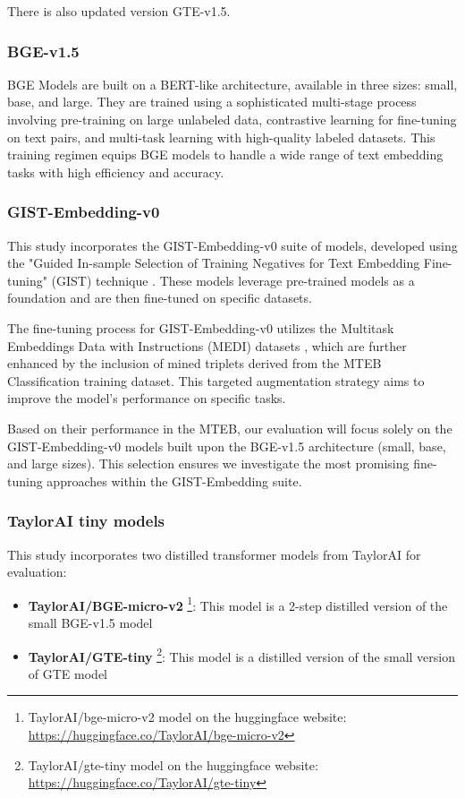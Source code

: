 There is also updated version \ac{GTE}-v1.5.

\subsubsection{BGE-v1.5} \label{model:bge}
\ac{BGE} Models \cite{xiao2024cpack} are built on a BERT-like architecture, available in three sizes: small, base, and large.
They are trained using a sophisticated multi-stage process involving pre-training on large unlabeled data, contrastive learning for fine-tuning on text pairs, and multi-task learning with high-quality labeled datasets.
This training regimen equips BGE models to handle a wide range of text embedding tasks with high efficiency and accuracy.

\subsubsection{GIST-Embedding-v0}
This study incorporates the GIST-Embedding-v0 suite of models, developed using the "Guided In-sample Selection of Training Negatives for Text Embedding Fine-tuning" (GIST) technique \cite{solatorio2024gistembed}.
These models leverage pre-trained models as a foundation and are then fine-tuned on specific datasets.

The fine-tuning process for GIST-Embedding-v0 utilizes the Multitask Embeddings Data with Instructions (MEDI) datasets \cite{su2023embedder}, which are further enhanced by the inclusion of mined triplets derived from the \ac{MTEB} Classification training dataset.
This targeted augmentation strategy aims to improve the model's performance on specific tasks.

Based on their performance in the \ac{MTEB}, our evaluation will focus solely on the GIST-Embedding-v0 models built upon the \ac{BGE}-v1.5 architecture (small, base, and large sizes).
This selection ensures we investigate the most promising fine-tuning approaches within the GIST-Embedding suite.

\subsubsection{TaylorAI tiny models} \label{model:taylorai}
This study incorporates two distilled transformer models from TaylorAI for evaluation:

\begin{itemize}
  \item \textbf{TaylorAI/BGE-micro-v2} \footnote{TaylorAI/bge-micro-v2 model on the huggingface website: \url{https://huggingface.co/TaylorAI/bge-micro-v2}}:
    This model is a 2-step distilled version of the small \ac{BGE}-v1.5 model
  \item \textbf{TaylorAI/GTE-tiny} \footnote{TaylorAI/gte-tiny model on the huggingface website: \url{https://huggingface.co/TaylorAI/gte-tiny}}:
    This model is a distilled version of the small version of \ac{GTE} model
\end{itemize}

